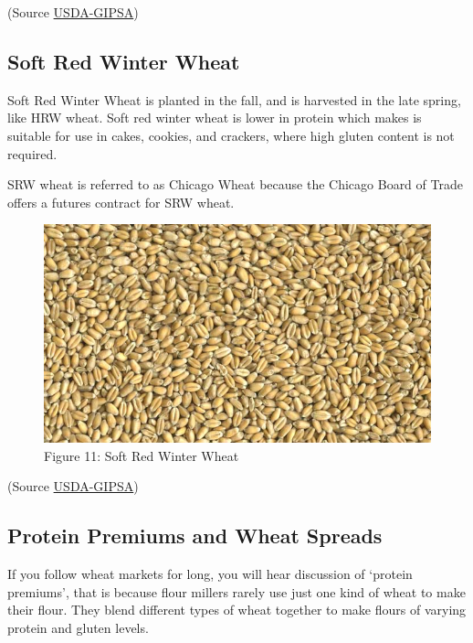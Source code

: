 \documentclass[
  letterpaper,
  DIV=11,
  numbers=noendperiod]{scrreprt}
\begin{document}
(Source
\href{https://www.gipsa.usda.gov/fgis/commgallery/gr_hrs.aspx}{USDA-GIPSA})

\hypertarget{soft-red-winter-wheat}{%
\subsection{Soft Red Winter Wheat}\label{soft-red-winter-wheat}}

Soft Red Winter Wheat is planted in the fall, and is harvested in the
late spring, like HRW wheat. Soft red winter wheat is lower in protein
which makes is suitable for use in cakes, cookies, and crackers, where
high gluten content is not required.

SRW wheat is referred to as Chicago Wheat because the Chicago Board of
Trade offers a futures contract for SRW wheat.

\begin{figure}

{\centering \includegraphics{images/SRW-Wheat.jpg}

}

\caption{Figure 11: Soft Red Winter Wheat}

\end{figure}

(Source
\href{https://www.gipsa.usda.gov/fgis/commgallery/gr_srw.aspx}{USDA-GIPSA})

\hypertarget{protein-premiums-and-wheat-spreads}{%
\subsection{Protein Premiums and Wheat
Spreads}\label{protein-premiums-and-wheat-spreads}}

If you follow wheat markets for long, you will hear discussion of
`protein premiums', that is because flour millers rarely use just one
kind of wheat to make their flour. They blend different types of wheat
together to make flours of varying protein and gluten levels.
\end{document}
